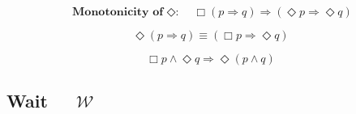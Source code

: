 \documentclass[fleqn, leqno]{article}
\newcommand{\Wait}{\;\mathcal{W}\;}
\newcommand{\Event}{\Diamond}
\newcommand{\Always}{\Box}
\newcommand{\spacer}{\vspace{-30pt}}
\begin{document}
\begin{equation}\label{E:alwaysImpEvents}
\textbf{Monotonicity of $\Event$:}\quad \Always (p \Rightarrow q) \Rightarrow (\Event p \Rightarrow \Event q)
\end{equation}

\spacer

\begin{equation}\label{E:eventImpAlways}
\Event (p \Rightarrow q) \equiv (\Always p \Rightarrow \Event q)
\end{equation}

\spacer

\begin{equation}\label{E:alwaysAndEvent}
\Always p \land \Event q \Rightarrow \Event (p \land q)
\end{equation}

\subsection*{Wait $\quad\Wait$}
\end{document}
